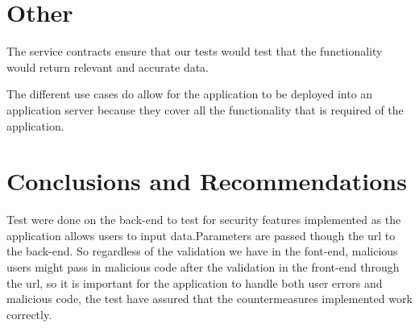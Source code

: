 \documentclass[a4paper,12pt]{article}
\begin{document}
\section{Other}
The service contracts ensure that our tests would test that the functionality would return relevant and accurate data.

The different use cases do allow for the application to be deployed into an application server because they cover all the functionality that is required of the application.
\section{Conclusions and Recommendations}
Test were done on the back-end to test for security features implemented as the application allows users to input data.Parameters are passed though the url to the back-end. So regardless of the validation we have in the font-end, malicious users might pass in  malicious code after the validation in the front-end through the url, so it is important for the application to handle both user errors and malicious code, the test have assured that the countermeasures implemented work correctly.
\end{document}
